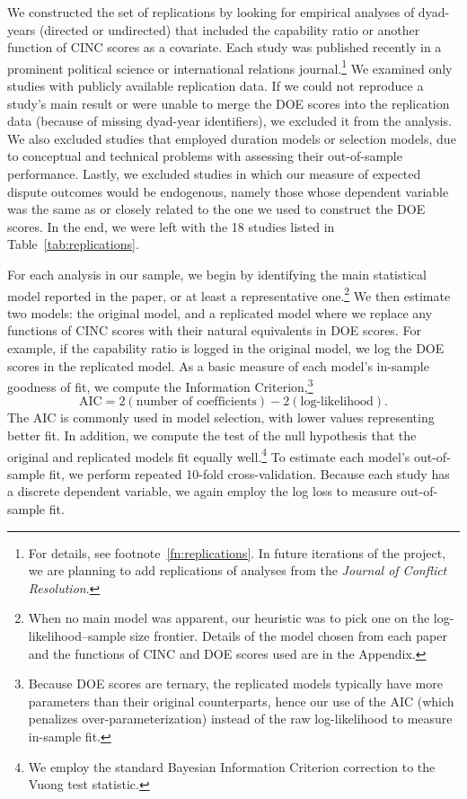 We constructed the set of replications by looking for empirical analyses of dyad-years (directed or undirected) that included the capability ratio or another function of CINC scores as a covariate.
Each study was published recently in a prominent political science or international relations journal.\footnote{
  For details, see footnote~\ref{fn:replications}.
  In future iterations of the project, we are planning to add replications of analyses from the \emph{Journal of Conflict Resolution}.
}
We examined only studies with publicly available replication data.
If we could not reproduce a study's main result or were unable to merge the DOE scores into the replication data (because of missing dyad-year identifiers), we excluded it from the analysis.
We also excluded studies that employed duration models or selection models, due to conceptual and technical problems with assessing their out-of-sample performance.
Lastly, we excluded studies in which our measure of expected dispute outcomes would be endogenous, namely those whose dependent variable was the same as or closely related to the one we used to construct the DOE scores.
In the end, we were left with the 18 studies listed in Table~\ref{tab:replications}.

For each analysis in our sample, we begin by identifying the main statistical model reported in the paper, or at least a representative one.\footnote{
  When no main model was apparent, our heuristic was to pick one on the log-likelihood--sample size frontier.
  Details of the model chosen from each paper and the functions of CINC and DOE scores used are in the Appendix.
}
We then estimate two models: the original model, and a replicated model where we replace any functions of CINC scores with their natural equivalents in DOE scores.
For example, if the capability ratio is logged in the original model, we log the DOE scores in the replicated model.
As a basic measure of each model's in-sample goodness of fit, we compute the \citet{Akaike:1974ih} Information Criterion,\footnote{
  Because DOE scores are ternary, the replicated models typically have more parameters than their original counterparts, hence our use of the AIC (which penalizes over-parameterization) instead of the raw log-likelihood to measure in-sample fit.
}
\begin{displaymath}
  \text{AIC}
  =
  2(\text{number of coefficients}) - 2(\text{log-likelihood}).
\end{displaymath}
The AIC is commonly used in model selection, with lower values representing better fit.
In addition, we compute the \citet{Vuong:1989uf} test of the null hypothesis that the original and replicated models fit equally well.\footnote{
  We employ the standard Bayesian Information Criterion \citep{Schwarz:1978kh} correction to the Vuong test statistic.
}
To estimate each model's out-of-sample fit, we perform repeated 10-fold cross-validation.
Because each study has a discrete dependent variable, we again employ the log loss to measure out-of-sample fit.


